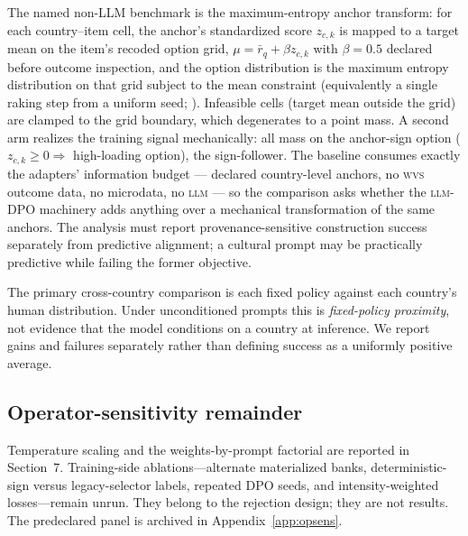 \documentclass[10pt,letterpaper]{article}
\newcommand{\WVS}{\textsc{wvs}}
\newcommand{\LLM}{\textsc{llm}}
\begin{document}
The named non-LLM benchmark is the maximum-entropy anchor transform: for each country--item cell, the anchor's standardized score $z_{c,k}$ is mapped to a target mean on the item's recoded option grid, $\mu=\bar{r}_{q}+\beta z_{c,k}$ with $\beta=0.5$ declared before outcome inspection, and the option distribution is the maximum entropy distribution on that grid subject to the mean constraint (equivalently a single raking step from a uniform seed; \cite{deming1940,jaynes1957,golan1996}). Infeasible cells (target mean outside the grid) are clamped to the grid boundary, which degenerates to a point mass. A second arm realizes the training signal mechanically: all mass on the anchor-sign option ($z_{c,k}\ge 0\Rightarrow$ high-loading option), the sign-follower. The baseline consumes exactly the adapters' information budget --- declared country-level anchors, no \WVS{} outcome data, no microdata, no \LLM{} --- so the comparison asks whether the \LLM{}-DPO machinery adds anything over a mechanical transformation of the same anchors. The analysis must report provenance-sensitive construction success separately from predictive alignment; a cultural prompt may be practically predictive while failing the former objective.

The primary cross-country comparison is each fixed policy against each country's human distribution. Under unconditioned prompts this is \emph{fixed-policy proximity}, not evidence that the model conditions on a country at inference. We report gains and failures separately rather than defining success as a uniformly positive average.

\subsection{Operator-sensitivity remainder}
Temperature scaling and the weights-by-prompt factorial are reported in Section~7. Training-side ablations---alternate materialized banks, deterministic-sign versus legacy-selector labels, repeated DPO seeds, and intensity-weighted losses---remain unrun. They belong to the rejection design; they are not results. The predeclared panel is archived in Appendix~\ref{app:opsens}.
\end{document}
